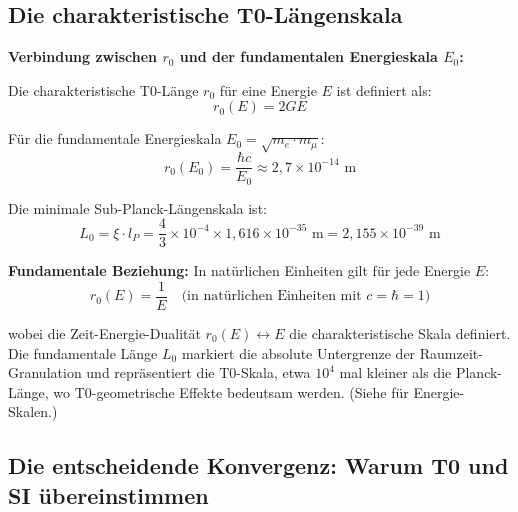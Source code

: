 	\subsection{Die charakteristische T0-Längenskala}
	
	\begin{insight}
		\textbf{Verbindung zwischen $r_0$ und der fundamentalen Energieskala $E_0$:}
		
		Die charakteristische T0-Länge $r_0$ für eine Energie $E$ ist definiert als:
		\begin{equation}
			r_0(E) = 2GE
		\end{equation}
		
		Für die fundamentale Energieskala $E_0 = \sqrt{m_e \cdot m_\mu}$:
		\begin{equation}
			r_0(E_0) = \frac{\hbar c}{E_0} \approx 2{,}7 \times 10^{-14} \text{ m}
		\end{equation}
		
		Die minimale Sub-Planck-Längenskala ist:
		\begin{equation}
			\boxed{L_0 = \xi \cdot l_P = \frac{4}{3} \times 10^{-4} \times 1{,}616 \times 10^{-35} \text{ m} = 2{,}155 \times 10^{-39} \text{ m}}
		\end{equation}
		
		\textbf{Fundamentale Beziehung:} In natürlichen Einheiten gilt für jede Energie $E$:
		\begin{equation}
			r_0(E) = \frac{1}{E} \quad \text{(in natürlichen Einheiten mit } c = \hbar = 1\text{)}
		\end{equation}
		
		wobei die Zeit-Energie-Dualität $r_0(E) \leftrightarrow E$ die charakteristische Skala definiert. Die fundamentale Länge $L_0$ markiert die absolute Untergrenze der Raumzeit-Granulation und repräsentiert die T0-Skala, etwa $10^4$ mal kleiner als die Planck-Länge, wo T0-geometrische Effekte bedeutsam werden. (Siehe \cite{T0_Energie_De} für Energie-Skalen.)
	\end{insight}
	
	\subsection{Die entscheidende Konvergenz: Warum T0 und SI übereinstimmen}
	

